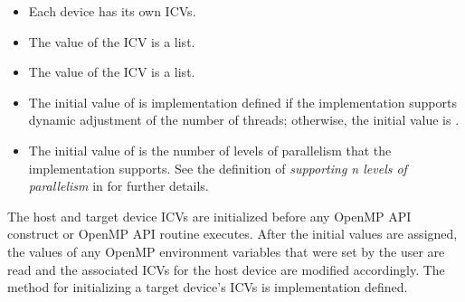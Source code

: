 \descr
\begin{itemize}
\item Each device has its own ICVs.

\item The value of the  ICV is a list. 

\item The value of the  ICV is a list. 

\item The initial value of  is implementation defined if the implementation supports 
dynamic adjustment of the number of threads; otherwise, the initial value is . 

\item The initial value of  is the number of levels of parallelism that 
the implementation supports. See the definition of \emph{supporting n levels of parallelism}
in  for further details.
\end{itemize}

The host and target device ICVs are initialized before any OpenMP API construct or 
OpenMP API routine executes. After the initial values are assigned, the values of any 
OpenMP environment variables that were set by the user are read and the associated 
ICVs for the host device are modified accordingly. The method for initializing a target 
device's ICVs is implementation defined.

